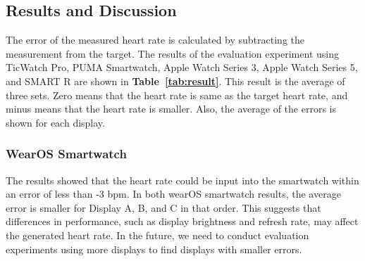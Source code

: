 \documentclass[sigchi,authordraft]{acmart}
\newcommand\tabref[1]{\textbf{Table~\ref{tab:#1}}}
\begin{document}


\subsection{Results and Discussion}
The error of the measured heart rate is calculated by subtracting the measurement from the target. The results of the evaluation experiment using TicWatch Pro, PUMA Smartwatch, Apple Watch Series 3, Apple Watch Series 5, and SMART R are shown in \tabref{result}. This result is the average of three sets. 
Zero means that the heart rate is same as the target heart rate, and minus means that the heart rate is smaller. Also, the average of the errors is shown for each display.



\subsubsection{WearOS Smartwatch}
The results showed that the heart rate could be input into the smartwatch within an error of less than -3 bpm. In both wearOS smartwatch results, the average error is smaller for Display A, B, and C in that order. This suggests that differences in performance, such as display brightness and refresh rate, may affect the generated heart rate. In the future, we need to conduct evaluation experiments using more displays to find displays with smaller errors.
\end{document}
